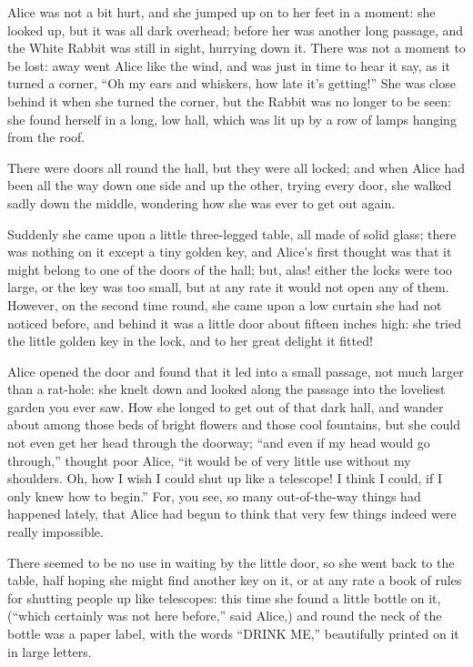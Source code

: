 \documentclass[
  12pt,
  twoside]{article}
\begin{document}
Alice was not a bit hurt, and she jumped up on to her feet in a moment:
she looked up, but it was all dark overhead; before her was another long
passage, and the White Rabbit was still in sight, hurrying down it.
There was not a moment to be lost: away went Alice like the wind, and
was just in time to hear it say, as it turned a corner, ``Oh my ears and
whiskers, how late it's getting!'' She was close behind it when she
turned the corner, but the Rabbit was no longer to be seen: she found
herself in a long, low hall, which was lit up by a row of lamps hanging
from the roof.

There were doors all round the hall, but they were all locked; and when
Alice had been all the way down one side and up the other, trying every
door, she walked sadly down the middle, wondering how she was ever to
get out again.

Suddenly she came upon a little three-legged table, all made of solid
glass; there was nothing on it except a tiny golden key, and Alice's
first thought was that it might belong to one of the doors of the hall;
but, alas! either the locks were too large, or the key was too small,
but at any rate it would not open any of them. However, on the second
time round, she came upon a low curtain she had not noticed before, and
behind it was a little door about fifteen inches high: she tried the
little golden key in the lock, and to her great delight it fitted!

Alice opened the door and found that it led into a small passage, not
much larger than a rat-hole: she knelt down and looked along the passage
into the loveliest garden you ever saw. How she longed to get out of
that dark hall, and wander about among those beds of bright flowers and
those cool fountains, but she could not even get her head through the
doorway; ``and even if my head would go through,'' thought poor Alice,
``it would be of very little use without my shoulders. Oh, how I wish I
could shut up like a telescope! I think I could, if I only knew how to
begin.'' For, you see, so many out-of-the-way things had happened
lately, that Alice had begun to think that very few things indeed were
really impossible.

There seemed to be no use in waiting by the little door, so she went
back to the table, half hoping she might find another key on it, or at
any rate a book of rules for shutting people up like telescopes: this
time she found a little bottle on it, (``which certainly was not here
before,'' said Alice,) and round the neck of the bottle was a paper
label, with the words ``DRINK ME,'' beautifully printed on it in large
letters.
\end{document}
